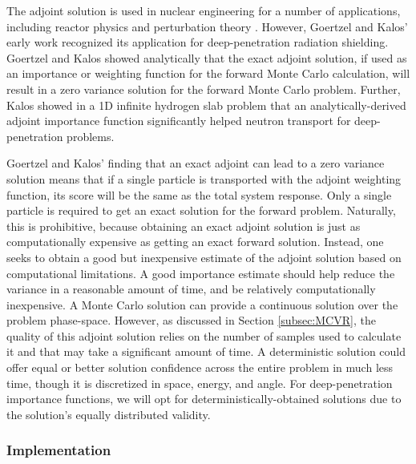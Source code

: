 The adjoint solution is used in nuclear engineering for a number of
applications, including reactor physics and perturbation theory
\cite{lewins_importance_1965, lewins_developments_1968,
greenspan_developments_1976, lux_monte_1991}.
However, Goertzel and Kalos' early work recognized its
application for deep-penetration radiation shielding.
Goertzel and Kalos \cite{goertzel_monte_1958}
showed analytically
that the exact adjoint solution, if used as an importance or weighting
function for the forward Monte Carlo calculation, will result in a zero variance
solution for the forward Monte Carlo problem. Further, Kalos
\cite{kalos_importance_1963} showed in a 1D infinite hydrogen slab problem that
an analytically-derived adjoint importance function significantly helped neutron
transport for deep-penetration problems.

Goertzel and Kalos' finding that an exact adjoint can lead to a zero variance
solution means that if a single particle is transported with the adjoint
weighting function, its score will be the same as the total system response.
Only a single particle is required to get an exact solution for the forward
problem. Naturally, this is prohibitive, because obtaining
an exact adjoint solution is just as computationally expensive as getting
an exact forward solution. Instead, one seeks to obtain a good but inexpensive estimate of the
adjoint solution based on computational limitations. A good importance estimate
should help reduce the variance in a reasonable amount of time, and be
relatively computationally inexpensive. A Monte Carlo solution can
provide a continuous solution over the problem phase-space. However, as
discussed in Section \ref{subsec:MCVR}, the quality of this adjoint solution
relies on the number of samples used to calculate it and that may take a
significant amount of time. A deterministic solution could
offer equal or better solution confidence across the entire problem in much less time, though it is
discretized
in space, energy, and angle. For deep-penetration importance functions, we will
opt for deterministically-obtained solutions due to the solution's equally
distributed validity.

\subsubsection{Implementation}

